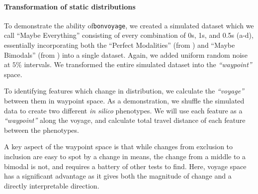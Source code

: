 
\paragraph{Transformation of static distributions}

To demonstrate the ability of\linebreak \texttt{bonvoyage}, we created a simulated dataset which we call ``Maybe Everything'' consisting of every combination of 0s, 1s, and 0.5s (a-d), essentially incorporating both the ``Perfect Modalities'' (from ) and ``Maybe Bimodals'' (from ) into a single dataset. Again, we added uniform random noise at $5\%$ intervals. We transformed the entire simulated dataset into the \emph{``waypoint''} space.


To identifying features which change in distribution, we calculate the \emph{``voyage''} between them in waypoint space. As a demonstration, we shuffle the simulated data to create two different \emph{in silico} phenotypes. We will use each feature as a \emph{``waypoint''} along the voyage, and calculate total travel distance of each feature between the phenotypes.


A key aspect of the waypoint space is that while changes from exclusion to inclusion are easy to spot by a change in means, the change from a middle to a bimodal is not, and requires a battery of other tests to find. Here, voyage space has a significant advantage as it gives both the magnitude of change and a directly interpretable direction.

